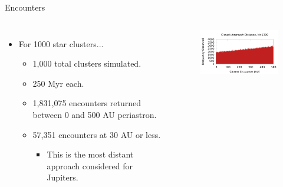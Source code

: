 \documentclass{beamer}
\begin{document}
\begin{frame}{Encounters}
    \begin{columns}
            \begin{itemize}
                \item For 1000 star clusters...
                    \begin{itemize}
                        \item 1,000 total clusters simulated.
                        \item 250 Myr each.
                        \item 1,831,075 encounters returned between 0 and 500 AU periastron.
                        \item 57,351 encounters at 30 AU or less.
                            \begin{itemize}
                                \item This is the most distant approach considered for Jupiters.
                            \end{itemize}
                    \end{itemize}
            \end{itemize}
            \begin{figure}
                \centering
                \includegraphics[width=2.35in]{slides/encounter_distance_1000}
            \end{figure}
    \end{columns}
\end{frame}
\end{document}
